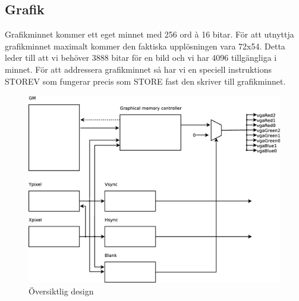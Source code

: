 \subsection{Grafik}
Grafikminnet kommer ett eget minnet med 256 ord à 16 bitar. För att utnyttja grafikminnet maximalt kommer den faktiska upplösningen vara 72x54. Detta leder till att vi behöver 3888 bitar för en bild och vi har 4096 tillgängliga i minnet. För att addressera grafikminnet så har vi en speciell instruktions STOREV som fungerar precis som STORE fast den skriver till grafikminnet. 
\begin{center}
\begin{figure}[H]
    \centering
\includegraphics[scale=0.30]{../grafik/graphics.eps}
\caption{Översiktlig design}
\label{fig:gui}
\end{figure}
\end{center} 
